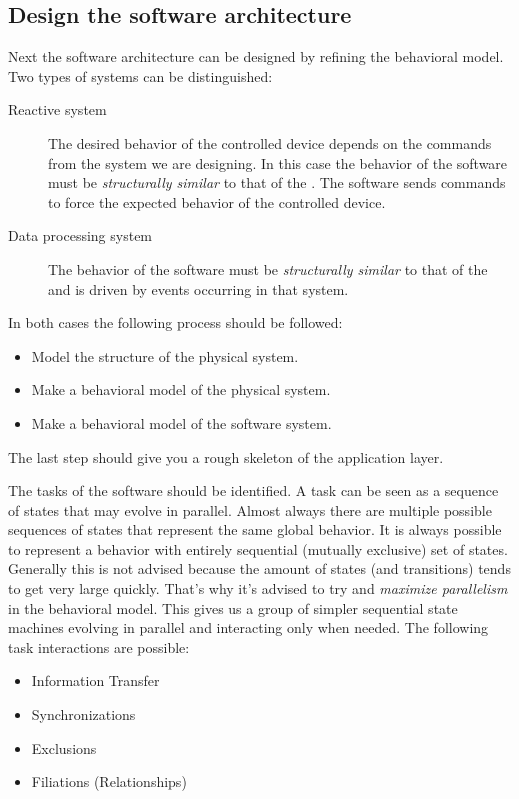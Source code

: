 \documentclass[../main.tex]{subfiles}
\begin{document}
\subsection{Design the software architecture}
\label{sss:design}
Next the  software architecture can be designed by refining the  behavioral model. 
Two types of systems can be distinguished:
\begin{description}
	\item[ Reactive system] The desired behavior of the controlled device depends on the commands from the system we are designing.
		In this case the behavior of the software must be \emph{structurally similar} to that of the .
		The software sends commands to force the expected behavior of the controlled device.
	\item[ Data processing system] The behavior of the software must be \emph{structurally similar} to that of the  and is driven by events occurring in that system.
\end{description}

In both cases the following process should be followed:
\begin{itemize}
	\item Model the structure of the physical system. 
	\item Make a  behavioral model of the physical system.
	\item Make a behavioral model of the software system.
\end{itemize}

The last step should give you a rough skeleton of the  application layer.

The tasks of the software should be identified.
A task can be seen as a sequence of states that may evolve in parallel.
Almost always there are multiple possible sequences of states that represent the same global behavior.
It is always possible to represent a behavior with entirely sequential (mutually exclusive) set of states.
Generally this is not advised because the amount of states (and transitions) tends to get very large quickly.
That's why it's advised to try and \emph{maximize parallelism} in the behavioral model.
This gives us a group of simpler sequential state machines evolving in parallel and interacting only when needed.
The following  task interactions are possible:
\begin{itemize}
	\item Information Transfer
	\item Synchronizations 
	\item Exclusions 
	\item Filiations (Relationships)
\end{itemize}
\end{document}
